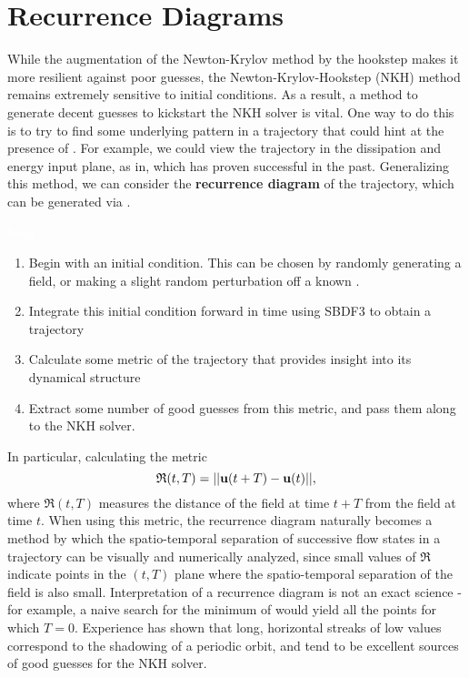 \section{Recurrence Diagrams}
 
 While the augmentation of the Newton-Krylov method by the hookstep makes it more resilient against poor guesses, the Newton-Krylov-Hookstep (NKH) method remains extremely sensitive to initial conditions. As a result, a method to generate decent guesses to kickstart the NKH solver is vital. One way to do this is to try to find some underlying pattern in a trajectory that could hint at the presence of \ecs. For example, we could view the trajectory in the dissipation and energy input plane, as in, which has proven successful in the past. Generalizing this method, we can consider the {\bf recurrence diagram} of the trajectory, which can be generated via . \\
 
  \begin{algorithm}\label{alg:rec}
  \textcolor{white}{haha}
 \begin{enumerate}
 \item Begin with an initial condition. This can be chosen by randomly generating a field, or making a slight random perturbation off a known \ecs.
 \item Integrate this initial condition forward in time using SBDF3 to obtain a trajectory 
 \item Calculate some metric of the trajectory that provides insight into its dynamical structure
 \item Extract some number of good guesses from this metric, and pass them along to the NKH solver.
 \end{enumerate}
 \end{algorithm} 
In particular, calculating the metric  
\begin{equation}\label{eq:recurrenceEQ}
 \mathfrak{R}(t,T) = ||\mathbf{u}(t+T) - \mathbf{u}(t)||,
 \end{equation}
where $\mathfrak{R}(t,T)$ measures the distance of the field at time $t+T$ from the field at time $t$. When using this metric, the recurrence diagram naturally becomes a method by which the spatio-temporal separation of successive flow states in a trajectory can be visually and numerically analyzed, since small values of $\mathfrak{R}$ indicate points in the $(t,T)$ plane where the spatio-temporal separation of the field is also small. Interpretation of a recurrence diagram is not an exact science - for example, a naive search for the minimum of  would yield all the points for which $T=0$. Experience has shown that long, horizontal streaks of low values correspond to the shadowing of a periodic orbit, and tend to be excellent sources of good guesses for the NKH solver. \\
 
